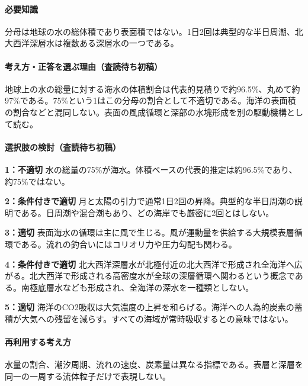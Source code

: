 \paragraph{必要知識} 分母は地球の水の総体積であり表面積ではない。1日2回は典型的な半日周潮、北大西洋深層水は複数ある深層水の一つである。

\paragraph{考え方・正答を選ぶ理由（査読待ち初稿）} 地球上の水の総量に対する海水の体積割合は代表的見積りで約96.5\%、丸めて約97\%である。75\%という1はこの分母の割合として不適切である。海洋の表面積の割合などと混同しない。表面の風成循環と深部の水塊形成を別の駆動機構として読む。

\paragraph{選択肢の検討（査読待ち初稿）}\mbox{}\par

\noindent\textbf{1：不適切} 水の総量の75\%が海水。体積ベースの代表的推定は約96.5\%であり、約75\%ではない。\par

\noindent\textbf{2：条件付きで適切} 月と太陽の引力で通常1日2回の昇降。典型的な半日周潮の説明である。日周潮や混合潮もあり、どの海岸でも厳密に2回とはしない。\par

\noindent\textbf{3：適切} 表面海水の循環は主に風で生じる。風が運動量を供給する大規模表層循環である。流れの釣合いにはコリオリ力や圧力勾配も関わる。\par

\noindent\textbf{4：条件付きで適切} 北大西洋深層水が北極付近の北大西洋で形成され全海洋へ広がる。北大西洋で形成される高密度水が全球の深層循環へ関わるという概念である。南極底層水なども形成され、全海洋の深水を一種類としない。\par

\noindent\textbf{5：適切} 海洋のCO2吸収は大気濃度の上昇を和らげる。海洋への人為的炭素の蓄積が大気への残留を減らす。すべての海域が常時吸収するとの意味ではない。\par

\paragraph{再利用する考え方} 水量の割合、潮汐周期、流れの速度、炭素量は異なる指標である。表層と深層を同一の一周する流体粒子だけで表現しない。

